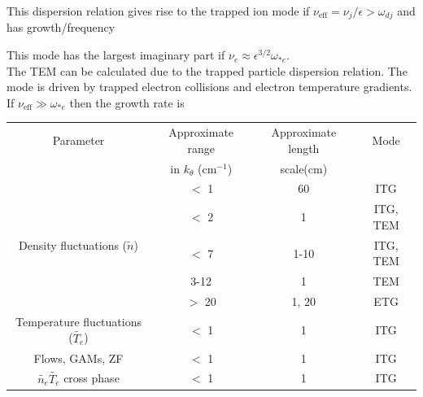 \noindent This dispersion relation gives rise to the trapped ion mode if $\nu_{\textrm{eff}}=\nu_{j}/\epsilon > \omega_{dj}$ and has growth/frequency

This mode has the largest imaginary part if $\nu_{e}\approx \epsilon^{3/2} \omega_{*e}$.\\

\noindent
The TEM can be calculated due to the trapped particle dispersion
relation. The mode is driven by trapped electron collisions and
electron temperature gradients. \\

\noindent If $\nu_{\textrm{eff}} \gg \omega_{*e}$ then the growth rate is 


\begin{table}
  \centering
  \begin{tabular}{c c c c}
    \hline
    Parameter\T&  Approximate range          &  Approximate length &  Mode\\
             \B&  in $k_\theta$ (cm$^{-1}$) &  scale(cm)          & \\
    \hline\hline
    \multirow{5}{*}{Density fluctuations ($\tilde{n}$)}\T& $<$ 1              & 60       & ITG \\
                                  & $<$ 2              & 1        & ITG, TEM \\
                                  & $<$ 7              & 1-10     & ITG, TEM \\
                                  & 3-12 & 1        & TEM \\
                                  & $>$ 20             & 1, 20    & ETG \\
    Temperature fluctuations ($\tilde{T_e}$)                 & $<$ 1              & 1        & ITG \\
    Flows, GAMs, ZF               & $<$ 1              & 1        & ITG \\
    $\tilde{n_e}\tilde{T_e}$ cross phase    \B& $<$ 1              & 1        & ITG\\
    \hline
  \end{tabular}
\end{table}
